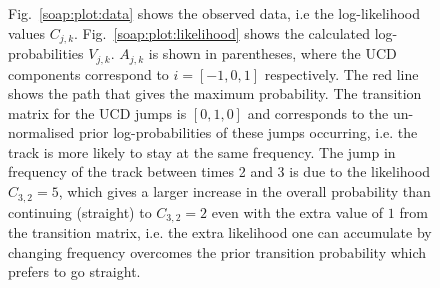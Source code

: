 \begin{figure}
\caption[Simple example of how Viterbi algorithm works.]{ Fig.~\ref{soap:plot:data} shows
the observed data, i.e the log-likelihood values $C_{j,k}$. Fig.~\ref{soap:plot:likelihood} shows the calculated
log-probabilities $V_{j,k}$. $A_{j,k}$ is shown in parentheses, where the \gls{UCD}
components correspond to $i= [-1,0,1]$ respectively. The red line shows the
path that gives the maximum probability. The transition matrix for the \gls{UCD} jumps is $[0,1,0]$ and corresponds to the un-normalised prior
log-probabilities of these jumps occurring, i.e. the track is more likely to stay at the same frequency. The jump in frequency of the track between times 2 and 3 is due to the likelihood $C_{3,2} = 5$, which gives a larger increase in the overall probability than continuing (straight) to $C_{3,2} = 2$ even with the extra value of $1$ from the transition matrix, i.e. the extra likelihood one can accumulate by changing frequency overcomes the prior transition probability which prefers to go straight.}
\label{soap:plots}
\end{figure}

